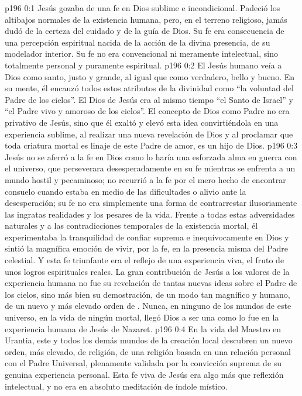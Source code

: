 \author{Comisión de seres intermedios}
\vs p196 0:1 Jesús gozaba de una fe en Dios sublime e incondicional. Padeció los altibajos normales de la existencia humana, pero, en el terreno religioso, jamás dudó de la certeza del cuidado y de la guía de Dios. Su fe era consecuencia de una percepción espiritual nacida de la acción de la divina presencia, de su modelador interior. Su fe no era convencional ni meramente intelectual, sino totalmente personal y puramente espiritual.
\vs p196 0:2 El Jesús humano veía a Dios como santo, justo y grande, al igual que como verdadero, bello y bueno. En su mente, él encauzó todos estos atributos de la divinidad como “la voluntad del Padre de los cielos”. El Dios de Jesús era al mismo tiempo “el Santo de Israel” y “el Padre vivo y amoroso de los cielos”. El concepto de Dios como Padre no era privativo de Jesús, sino que él exaltó y elevó esta idea convirtiéndola en una experiencia sublime, al realizar una nueva revelación de Dios y al proclamar que toda criatura mortal es linaje de este Padre de amor, es un hijo de Dios.
\vs p196 0:3 Jesús no se aferró a la fe en Dios como lo haría una esforzada alma en guerra con el universo, que perseverara desesperadamente en su fe mientras se enfrenta a un mundo hostil y pecaminoso; no recurrió a la fe por el mero hecho de encontrar consuelo cuando estaba en medio de las dificultades o alivio ante la desesperación; su fe no era simplemente una forma de contrarrestar ilusoriamente las ingratas realidades y los pesares de la vida. Frente a todas estas adversidades naturales y a las contradicciones temporales de la existencia mortal, él experimentaba la tranquilidad de confiar suprema e inequívocamente en Dios y sintió la magnífica emoción de vivir, por la fe, en la presencia misma del Padre celestial. Y esta fe triunfante era el reflejo de una experiencia viva, el fruto de unos logros espirituales reales. La gran contribución de Jesús a los valores de la experiencia humana no fue su revelación de tantas nuevas ideas sobre el Padre de los cielos, sino más bien su demostración, de un modo tan magnífico y humano, de un nuevo y más elevado orden de . Nunca, en ninguno de los mundos de este universo, en la vida de ningún mortal, llegó Dios a ser una  como lo fue en la experiencia humana de Jesús de Nazaret.
\vs p196 0:4 En la vida del Maestro en Urantia, este y todos los demás mundos de la creación local descubren un nuevo orden, más elevado, de religión, de una religión basada en una relación personal con el Padre Universal, plenamente validada por la convicción suprema de su genuina experiencia personal. Esta fe viva de Jesús era algo más que reflexión intelectual, y no era en absoluto meditación de índole místico.
